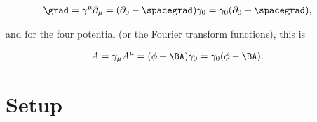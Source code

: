 \begin{align}\label{eqn:ftMaxVacuum:4}
\grad &= \gamma^\mu \partial_\mu = (\partial_0 - \spacegrad) \gamma_0 = \gamma_0 (\partial_0 + \spacegrad),
\end{align}

and for the four potential (or the Fourier transform functions), this is

\begin{align}\label{eqn:ftMaxVacuum:5}
A &= \gamma_\mu A^\mu = (\phi + \BA) \gamma_0 = \gamma_0 (\phi - \BA).
\end{align}

\section{Setup}

\EndArticle

